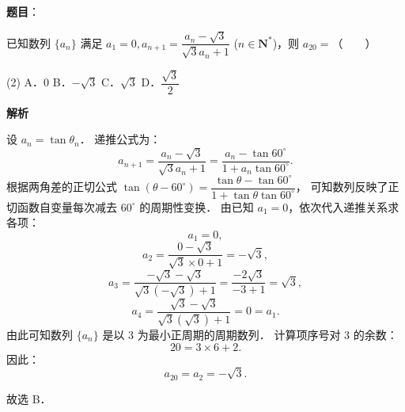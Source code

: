 \begin{answer}

\textbf{题目}：

已知数列 $\{a_n\}$ 满足 $a_1 = 0, a_{n+1} = \dfrac{a_n - \sqrt{3}}{\sqrt{3}a_n + 1}$ ($n \in \mathbf{N}^*$)，则 $a_{20} =$\mbox{（　　）}

\begin{gkopts}(2)
\task A．0
\task B．$-\sqrt{3}$
\task C．$\sqrt{3}$
\task D．$\dfrac{\sqrt{3}}{2}$
\end{gkopts}

\textbf{解析}

设 $a_n = \tan\theta_n$．
递推公式为：
\nopagebreak[4]
\[
a_{n+1} = \frac{a_n - \sqrt{3}}{\sqrt{3}a_n + 1} = \frac{a_n - \tan 60^\circ}{1 + a_n \tan 60^\circ}.
\]
根据两角差的正切公式 $\tan(\theta - 60^\circ) = \dfrac{\tan\theta - \tan 60^\circ}{1 + \tan\theta\tan 60^\circ}$，
可知数列反映了正切函数自变量每次减去 $60^\circ$ 的周期性变换．
由已知 $a_1 = 0$，依次代入递推关系求各项：
\nopagebreak[4]
\[
a_1 = 0,
\]
\nopagebreak[4]
\[
a_2 = \frac{0 - \sqrt{3}}{\sqrt{3} \times 0 + 1} = -\sqrt{3},
\]
\nopagebreak[4]
\[
a_3 = \frac{-\sqrt{3} - \sqrt{3}}{\sqrt{3}(-\sqrt{3}) + 1} = \frac{-2\sqrt{3}}{-3 + 1} = \sqrt{3},
\]
\nopagebreak[4]
\[
a_4 = \frac{\sqrt{3} - \sqrt{3}}{\sqrt{3}(\sqrt{3}) + 1} = 0 = a_1.
\]
由此可知数列 $\{a_n\}$ 是以 3 为最小正周期的周期数列．
计算项序号对 3 的余数：
\nopagebreak[4]
\[
20 = 3 \times 6 + 2.
\]
因此：
\nopagebreak[4]
\[
a_{20} = a_2 = -\sqrt{3}.
\]

故选 B．


\end{answer}
